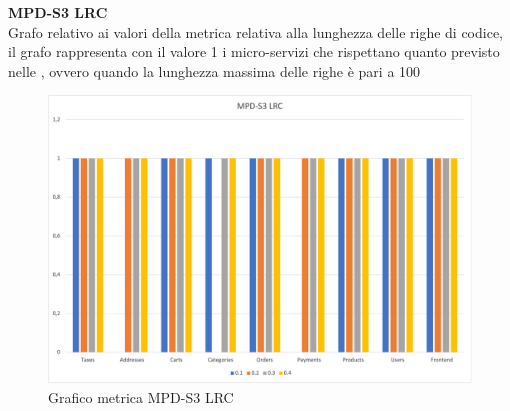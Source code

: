 \begin{center}
    \textbf{MPD-S3 LRC} \\
    Grafo relativo ai valori della metrica relativa alla lunghezza delle righe di codice, il grafo rappresenta con il valore 1 i micro-servizi
    che rispettano quanto previsto nelle , ovvero quando la lunghezza massima delle righe è pari a 100     \begin{figure}[!htb]
        \centering
        \includegraphics[scale=0.50]{res/images/ra/ra_lrc.png}
        \caption{Grafico metrica MPD-S3 LRC}
    \end{figure}
    \begin{center}
    \end{center}
\end{center}

